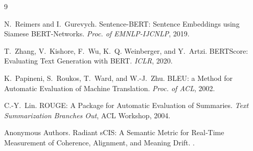 \documentclass[11pt]{article}
\theoremstyle{definition}
\begin{document}
\begin{thebibliography}{9}

N.~Reimers and I.~Gurevych.
\newblock Sentence-BERT: Sentence Embeddings using Siamese BERT-Networks.
\newblock \emph{Proc. of EMNLP-IJCNLP}, 2019.

T.~Zhang, V.~Kishore, F.~Wu, K.~Q. Weinberger, and Y.~Artzi.
\newblock BERTScore: Evaluating Text Generation with BERT.
\newblock \emph{ICLR}, 2020.

K.~Papineni, S.~Roukos, T.~Ward, and W.-J.~Zhu.
\newblock BLEU: a Method for Automatic Evaluation of Machine Translation.
\newblock \emph{Proc. of ACL}, 2002.

C.-Y.~Lin.
\newblock ROUGE: A Package for Automatic Evaluation of Summaries.
\newblock \emph{Text Summarization Branches Out}, ACL Workshop, 2004.

Anonymous Authors.
\newblock Radiant sCIS: A Semantic Metric for Real‑Time Measurement of Coherence, Alignment, and Meaning Drift.
.

\end{thebibliography}
\end{document}
